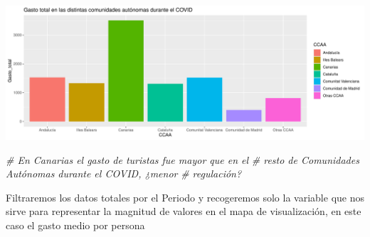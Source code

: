 \documentclass[data,article,submit,moreauthors,pdftex]{Definitions/mdpi}
\newenvironment{Shaded}{\begin{snugshade}}{\end{snugshade}}
\newcommand{\CommentTok}[1]{\textcolor[rgb]{0.56,0.35,0.01}{\textit{#1}}}
\begin{document}
\includegraphics{ProyectoAED2024_Rmd_files/figure-latex/unnamed-chunk-24-1.pdf}

\begin{Shaded}
\begin{Highlighting}[]
\CommentTok{\# En Canarias el gasto de turistas fue mayor que en el}
\CommentTok{\# resto de Comunidades Autónomas durante el COVID, ¿menor}
\CommentTok{\# regulación?}
\end{Highlighting}
\end{Shaded}

Filtraremos los datos totales por el Periodo y recogeremos solo la
variable que nos sirve para representar la magnitud de valores en el
mapa de visualización, en este caso el gasto medio por persona
\end{document}
